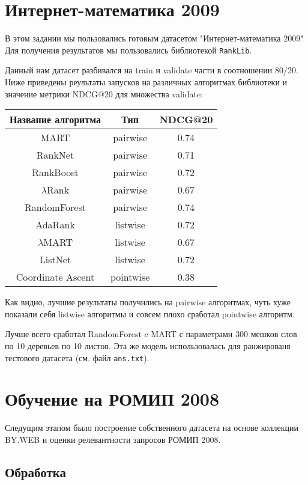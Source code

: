 \section{Интернет-математика 2009}

В этом задании мы пользовались готовым датасетом "Интернет-математика 2009"
Для получения результатов мы пользовались библиотекой \texttt{RankLib}.

Данный нам датасет разбивался на train и validate части в соотношении 80/20. Ниже приведены реультаты запусков на различных алгоритмах библиотеки и значение метрики NDCG@20 для множества validate:


\begin{tabular}{|c|c|c|}
	\hline
	
	Название алгоритма & Тип& NDCG@20\\
	\hline
	MART & pairwise & 0.74\\
	RankNet & pairwise & 0.71\\
	RankBoost & pairwise & 0.72\\
	$\lambda$Rank & pairwise & 0.67\\
	RandomForest& pairwise & 0.74\\
	\hline
	AdaRank & listwise & 0.72\\
	$\lambda$MART & listwise & 0.67\\
	ListNet & listwise & 0.72\\
	\hline
	Coordinate Ascent & pointwise & 0.38\\
	\hline
\end{tabular} 

Как видно, лучшие результаты получились на pairwise алгоритмах, чуть хуже показали себя listwise алгоритмы и совсем плохо сработал pointwise алгоритм. 

Лучше всего сработал RandomForest c MART с параметрами 300 мешков слов по 10 деревьев по 10 листов. Эта же модель использовалась для ранжированя тестового датасета (см. файл \texttt{ans.txt}).

\section{Обучение на РОМИП 2008}

Следущим этапом было построение собственного датасета на основе коллекции BY.WEB и оценки релевантности запросов РОМИП 2008.

\subsection{Обработка}

